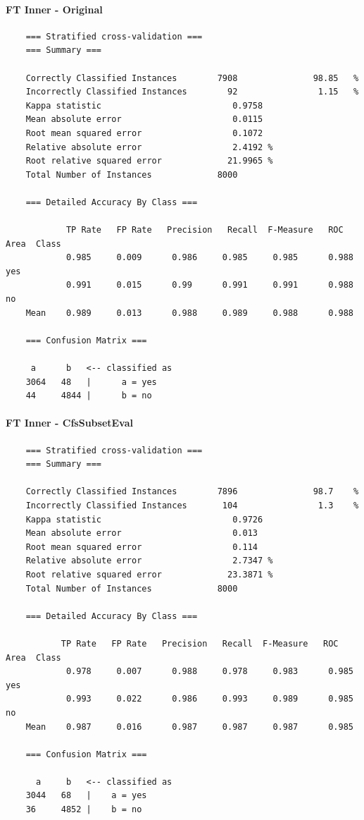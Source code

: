 \paragraph{FT Inner - Original}
{\footnotesize
	\begin{verbatim}
	=== Stratified cross-validation ===
	=== Summary ===
	
	Correctly Classified Instances        7908               98.85   %
	Incorrectly Classified Instances        92                1.15   %
	Kappa statistic                          0.9758
	Mean absolute error                      0.0115
	Root mean squared error                  0.1072
	Relative absolute error                  2.4192 %
	Root relative squared error             21.9965 %
	Total Number of Instances             8000     
	
	=== Detailed Accuracy By Class ===
	
	        TP Rate   FP Rate   Precision   Recall  F-Measure   ROC Area  Class
	        0.985     0.009      0.986     0.985     0.985      0.988    yes
	        0.991     0.015      0.99      0.991     0.991      0.988    no
	Mean    0.989     0.013      0.988     0.989     0.988      0.988
	
	=== Confusion Matrix ===
	
	 a      b   <-- classified as
	3064   48   |      a = yes
	44     4844 |      b = no
	\end{verbatim}
}

\paragraph{FT Inner - CfsSubsetEval}
{\footnotesize
	\begin{verbatim}
	=== Stratified cross-validation ===
	=== Summary ===
	
	Correctly Classified Instances        7896               98.7    %
	Incorrectly Classified Instances       104                1.3    %
	Kappa statistic                          0.9726
	Mean absolute error                      0.013 
	Root mean squared error                  0.114 
	Relative absolute error                  2.7347 %
	Root relative squared error             23.3871 %
	Total Number of Instances             8000     
	
	=== Detailed Accuracy By Class ===
	
	       TP Rate   FP Rate   Precision   Recall  F-Measure   ROC Area  Class
	        0.978     0.007      0.988     0.978     0.983      0.985    yes
	        0.993     0.022      0.986     0.993     0.989      0.985    no
	Mean    0.987     0.016      0.987     0.987     0.987      0.985
	
	=== Confusion Matrix ===
	
	  a     b   <-- classified as
	3044   68   |    a = yes
	36     4852 |    b = no	
	\end{verbatim}
}

